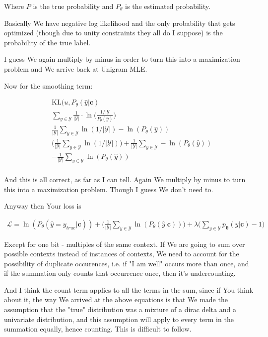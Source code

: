 \documentclass{article}
\newcommand{\KL}{\mathrm{KL}}
\newcommand{\vtheta}{\boldsymbol{\theta}}
\newcommand{\model}{p_{\vtheta}}
\newcommand{\context}{\boldsymbol{c}}
\begin{document}
		Where $P$ is the true probability and $P_\theta$ is the estimated probability.
		
		Basically We have negative log likelihood and the only probability that gets optimized (though due to unity constraints they all do I suppose) is the probability of the true label.
		
		I guess We again multiply by minus in order to turn this into a maximization problem and We arrive back at Unigram MLE.
		
		Now for the smoothing term:
		
		\begin{align}
			& \KL(u, P_\theta(\hat{y}|\context)\\
			& \sum_{y\in\mathcal{Y}} \frac{1}{|\mathcal{Y}|} \cdot \ln\bigg(\frac{1/|\mathcal{Y}}{P_\theta(\hat{y})} \bigg)\\
			& \frac{1}{|\mathcal{Y}|} \sum_{y\in\mathcal{Y}}   \ln(1/|\mathcal{Y}|) - \ln(P_\theta(\hat{y}) )\\
			& \bigg(\frac{1}{|\mathcal{Y}|} \sum_{y\in\mathcal{Y}}   \ln(1/|\mathcal{Y}|)\bigg)  + \frac{1}{|\mathcal{Y}|} \sum_{y\in\mathcal{Y}} - \ln(P_\theta(\hat{y}) )\\
			& - \frac{1}{|\mathcal{Y}|} \sum_{y\in\mathcal{Y}} \ln(P_\theta(\hat{y}) )\\
		\end{align}
		
		And this is all correct, as far as I can tell. Again We multiply by minus to turn this into a maximization problem. Though I guess We don't need to.
		
		Anyway then Your loss is
		
		\begin{align}
			\mathcal{L} = \ln(P_\theta(\hat{y} = y_{true}|\context)) + \bigg(\frac{1}{|\mathcal{Y}|} \sum_{y\in\mathcal{Y}} \ln(P_\theta(\hat{y} | \context) )\bigg) + \lambda\bigg(\sum_{y\in\mathcal{Y}}\model(y|\context) - 1 \bigg)
		\end{align}
		
		Except for one bit - multiples of the same context. If We are going to sum over possible contexts instead of instances of contexts, We need to account for the possibility of duplicate occurences, i.e. if "I am well" occurs more than once, and if the summation only counts that occurrence once, then it's undercounting. 
		
		And I think the count term applies to all the terms in the sum, since if You think about it, the way We arrived at the above equations is that We made the assumption that the "true" distribution was a mixture of a dirac delta and a univariate distribution, and this assumption will apply to every term in the summation equally, hence counting. This is difficult to follow.
		
\end{document}
